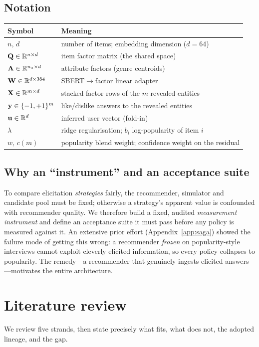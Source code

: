 \subsection{Notation}
\begin{table}[h]\centering\small
\begin{tabular}{ll}
\toprule
Symbol & Meaning\\
\midrule
$n,\,d$ & number of items; embedding dimension ($d{=}64$)\\
$\mathbf{Q}\in\mathbb{R}^{n\times d}$ & item factor matrix (the shared space)\\
$\mathbf{A}\in\mathbb{R}^{n_a\times d}$ & attribute factors (genre centroids)\\
$\mathbf{W}\in\mathbb{R}^{d\times 384}$ & SBERT$\to$factor linear adapter\\
$\mathbf{X}\in\mathbb{R}^{m\times d}$ & stacked factor rows of the $m$ revealed entities\\
$\mathbf{y}\in\{-1,+1\}^m$ & like/dislike answers to the revealed entities\\
$\mathbf{u}\in\mathbb{R}^d$ & inferred user vector (fold-in)\\
$\lambda$ & ridge regularisation; $b_i$ log-popularity of item $i$\\
$w,\,c(m)$ & popularity blend weight; confidence weight on the residual\\
\bottomrule
\end{tabular}
\end{table}

\subsection{Why an ``instrument'' and an acceptance suite}
To compare elicitation \emph{strategies} fairly, the recommender, simulator and candidate pool must be fixed;
otherwise a strategy's apparent value is confounded with recommender quality. We therefore build a fixed, audited
\emph{measurement instrument} and define an acceptance suite it must pass before any policy is measured against
it. An extensive prior effort (Appendix~\ref{app:saga}) showed the failure mode of getting this wrong: a
recommender \emph{frozen} on popularity-style interviews cannot exploit cleverly elicited information, so every
policy collapses to popularity. The remedy---a recommender that genuinely ingests elicited answers---motivates the
entire architecture.

\section{Literature review}\label{sec:lit}
We review five strands, then state precisely what fits, what does not, the adopted lineage, and the gap.

